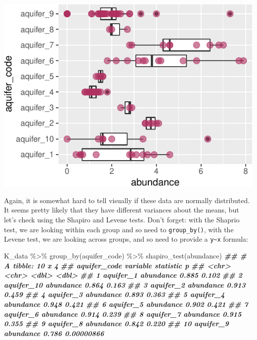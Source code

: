 \documentclass[
]{krantz}
\newenvironment{Shaded}{\begin{snugshade}}{\end{snugshade}}
\newcommand{\DocumentationTok}[1]{\textcolor[rgb]{0.56,0.35,0.01}{\textbf{\textit{#1}}}}
\newcommand{\FunctionTok}[1]{\textcolor[rgb]{0.00,0.00,0.00}{#1}}
\newcommand{\NormalTok}[1]{#1}
\newcommand{\SpecialCharTok}[1]{\textcolor[rgb]{0.00,0.00,0.00}{#1}}
\begin{document}
\begin{center}\includegraphics{index_files/figure-latex/unnamed-chunk-143-1} \end{center}

Again, it is somewhat hard to tell visually if these data are normally distributed. It seems pretty likely that they have different variances about the means, but let's check using the Shapiro and Levene tests. Don't forget: with the Shaprio test, we are looking within each group and so need to \texttt{group\_by()}, with the Levene test, we are looking across groups, and so need to provide a \texttt{y\textasciitilde{}x} formula:

\begin{Shaded}
\begin{Highlighting}[]
\NormalTok{K\_data }\SpecialCharTok{\%\textgreater{}\%}
  \FunctionTok{group\_by}\NormalTok{(aquifer\_code) }\SpecialCharTok{\%\textgreater{}\%} 
  \FunctionTok{shapiro\_test}\NormalTok{(abundance)}
\DocumentationTok{\#\# \# A tibble: 10 x 4}
\DocumentationTok{\#\#    aquifer\_code variable  statistic          p}
\DocumentationTok{\#\#    \textless{}chr\textgreater{}        \textless{}chr\textgreater{}         \textless{}dbl\textgreater{}      \textless{}dbl\textgreater{}}
\DocumentationTok{\#\#  1 aquifer\_1    abundance     0.885 0.102     }
\DocumentationTok{\#\#  2 aquifer\_10   abundance     0.864 0.163     }
\DocumentationTok{\#\#  3 aquifer\_2    abundance     0.913 0.459     }
\DocumentationTok{\#\#  4 aquifer\_3    abundance     0.893 0.363     }
\DocumentationTok{\#\#  5 aquifer\_4    abundance     0.948 0.421     }
\DocumentationTok{\#\#  6 aquifer\_5    abundance     0.902 0.421     }
\DocumentationTok{\#\#  7 aquifer\_6    abundance     0.914 0.239     }
\DocumentationTok{\#\#  8 aquifer\_7    abundance     0.915 0.355     }
\DocumentationTok{\#\#  9 aquifer\_8    abundance     0.842 0.220     }
\DocumentationTok{\#\# 10 aquifer\_9    abundance     0.786 0.00000866}
\end{Highlighting}
\end{Shaded}
\end{document}
